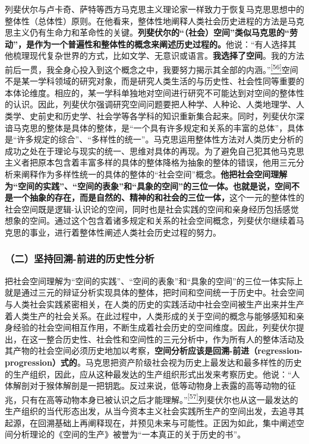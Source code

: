 \documentclass[UTF8, fontset = sourcesans, a4paper, oneside, zihao =
-4, scheme=chinese, no-math, space=true]{ctexbook}
\begin{document}
列斐伏尔与卢卡奇、萨特等西方马克思主义理论家一样致力于恢复马克思思想中的整体性（总体性）原则。在他看来，整体性地阐释人类社会历史进程的方法是马克思主义仍有生命力和革命性的关键。\textbf{列斐伏尔的``（社会）空间''类似马克思的``劳动''，是作为一个普遍性和整体性的概念来阐述历史过程的。}他说：``有人选择其他梳理现代复杂世界的方式，比如文学、无意识或语言。\textbf{我选择了空间}。我的方法前后一贯，我全身心投入到这个概念之中，我要努力揭示其全部的内涵。''\protect\hypertarget{part0005_split_003.htmlux5cux23w56}{}{}\protect\hyperlink{part0005_split_003.htmlux5cux23m56}{\textsuperscript{{[}56{]}}}空间不是某一学科领域的研究对象，而是研究人类生活的与历史性、社会性同等重要的本体论维度。相应的，某一学科单独地对空间进行研究不可能达到对空间的整体性的认识。因此，列斐伏尔强调研究空间问题要把人种学、人种论、人类地理学、人类学、史前史和历史学、社会学等各学科的知识重新集合起来。同时，列斐伏尔深谙马克思的整体是具体的整体，是``一个具有许多规定和关系的丰富的总体''，具体是``许多规定的综合''、``多样性的统一''。马克思运用整体性方法对人类历史分析的成功之处在于理论与现实的统一、思维对具体的再现。为了避免自己犯其他马克思主义者把原本包含着丰富多样的具体的整体降格为抽象的整体的错误，他用三元分析来阐释作为多样性统一的具体的整体的``社会空间''概念。\textbf{他把社会空间理解为``空间的实践''、``空间的表象''和``具象的空间''的三位一体。也就是说，空间不是一个抽象的存在，而是自然的、精神的和社会的三位一体，}这个一元的整体性的社会空间既是逻辑-认识论的空间，同时也是社会实践的空间和亲身经历包括感觉想象的空间。通过这个包含着诸多规定和关系的社会空间概念，列斐伏尔继续着马克思的事业，进行着整体性阐述人类社会历史过程的努力。

\subsubsection{（二）坚持回溯-前进的历史性分析}\label{part0005_split_003.htmlux5cux23d006}

把社会空间理解为``空间的实践''、``空间的表象''和``具象的空间''的三位一体实际上就是通过三元的辩证分析实现具体的整体，把时间和空间统一于历史中。社会空间与人类社会实践紧密相关，在人类的历史的实践活动中社会空间被生产出来并生产着人类生产的社会关系。在此过程中，人类形成的关于空间的概念与能够感知和亲身经验的社会空间相互作用，不断生成着社会历史的空间维度。因此，列斐伏尔提出，在这一整合历史性、社会性和空间性的三元分析中，作为所有人的整体活动及其产物的社会空间必须历史地加以考察，\textbf{空间分析应该是回溯-前进（regression-progression）式的}。马克思把资产阶级社会视为历史上最发达和最多样性的历史的生产组织，因此，应从这种最发达的生产组织形式出发来考察历史。他说：``人体解剖对于猴体解剖是一把钥匙。反过来说，低等动物身上表露的高等动物的征兆，只有在高等动物本身已被认识之后才能理解。''\protect\hypertarget{part0005_split_003.htmlux5cux23w57}{}{}\protect\hyperlink{part0005_split_003.htmlux5cux23m57}{\textsuperscript{{[}57{]}}}列斐伏尔也从这一最发达的生产组织的当代形态出发，从当今资本主义社会实践所生产的空间出发，去追寻其起源，在回溯基础上再阐释现在，并预见未来与可能性。正因为如此，集中阐述空间分析理论的《空间的生产》被誉为``一本真正的关于历史的书''。
\end{document}
